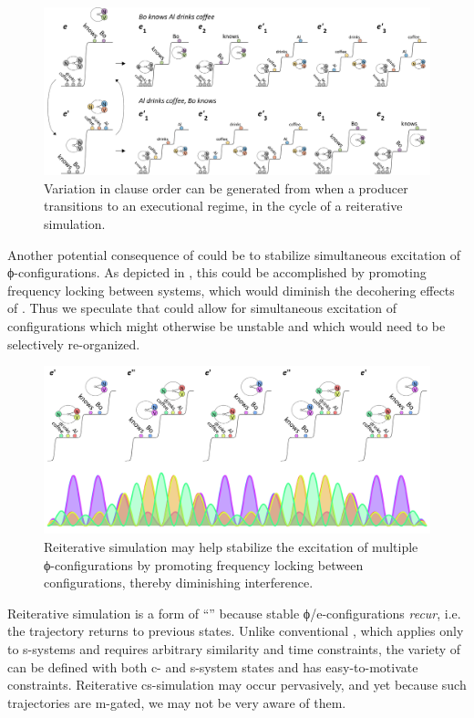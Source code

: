   
\begin{figure}
\includegraphics[width=\textwidth]{figures/Tilsen-img116.png}
\caption{Variation in clause order can be generated from when a producer transitions to an executional regime, in the cycle of a reiterative simulation.}
\label{fig:5:12}
\end{figure}
 

  Another potential consequence of  could be to stabilize simultaneous excitation of ϕ-con\-fig\-u\-ra\-tions. As depicted in {}, this could be accomplished by promoting frequency locking between systems, which would diminish the decohering effects of . Thus we speculate that  could allow for simultaneous excitation of configurations which might otherwise be unstable and which would need to be selectively re-or\-ga\-nized.

  
\begin{figure}
\includegraphics[width=\textwidth]{figures/Tilsen-img117.png}
\caption{Reiterative simulation may help stabilize the excitation of multiple ϕ-con\-fig\-u\-ra\-tions by promoting frequency locking between configurations, thereby diminishing interference.}
\label{fig:5:13}
\end{figure}
 

  Reiterative simulation is a form of “” because stable ϕ/e-con\-fig\-u\-ra\-tions \textit{recur}, i.e. the  trajectory returns to previous states. Unlike conventional , which applies only to s-sys\-tems and requires arbitrary similarity and time constraints, the  variety of  can be defined with both c- and s-sys\-tem states and has easy-to-motivate constraints. Reiterative cs-simulation may occur pervasively, and yet because such trajectories are m-gated, we may not be very aware of them. 

